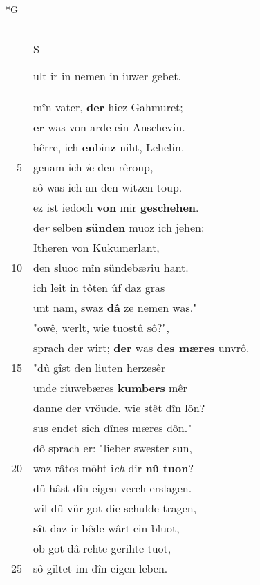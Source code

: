 \documentclass[8pt,a4paper,notitlepage]{article}
\begin{document}
\begin{table}[ht]
\begin{minipage}[t]{0.5\linewidth}
\end{minipage}
\end{table}
\newpage
\begin{table}[ht]
\begin{minipage}[t]{0.5\linewidth}
\small
\begin{center}*G
\end{center}
\begin{tabular}{rl}
 & \begin{large}S\end{large}ult ir in nemen in iuwer gebet.\\ 
 & mîn vater, \textbf{der} hiez Gahmuret;\\ 
 & \textbf{er} was von arde ein Anschevin.\\ 
 & hêrre, ich \textbf{en}bin\textbf{z} niht, Lehelin.\\ 
5 & genam ich \textit{i}e den rêroup,\\ 
 & sô was ich an den witzen toup.\\ 
 & ez ist iedoch \textbf{von} mir \textbf{geschehen}.\\ 
 & de\textit{r} selben \textbf{sünden} muoz ich jehen:\\ 
 & Itheren von Kukumerlant,\\ 
10 & den sluoc mîn sündebæ\textit{r}iu hant.\\ 
 & ich leit in tôten ûf daz gras\\ 
 & unt nam, swaz \textbf{dâ} ze nemen was."\\ 
 & "owê, werlt, wie tuostû sô?",\\ 
 & sprach der wirt; \textbf{der} was \textbf{des mæres} unvrô.\\ 
15 & "dû gîst den liuten herzesêr\\ 
 & unde riuwebæres \textbf{kumbers} mêr\\ 
 & danne der vröude. wie stêt dîn lôn?\\ 
 & sus endet sich dînes mæres dôn."\\ 
 & dô sprach er: "lieber swester sun,\\ 
20 & waz râtes möht i\textit{ch} dir \textbf{nû} \textbf{tuon}?\\ 
 & dû hâst dîn eigen verch erslagen.\\ 
 & wil dû vür got die schulde tragen,\\ 
 & \textbf{sît} daz ir bêde wârt ein bluot,\\ 
 & ob got dâ rehte gerihte tuot,\\ 
25 & sô giltet im dîn eigen leben.\\ 

\end{tabular}
\end{minipage}
\end{table}
\end{document}
